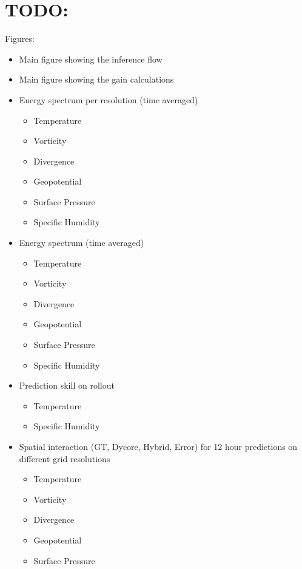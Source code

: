 \section{TODO:}

Figures:
\begin{itemize}
    \item Main figure showing the inference flow
    \item Main figure showing the gain calculations
    \item Energy spectrum per resolution (time averaged)
        \begin{itemize}
            \item Temperature
            \item Vorticity
            \item Divergence
            \item Geopotential
            \item Surface Pressure
            \item Specific Humidity
        \end{itemize} 
    \item Energy spectrum (time averaged)
        \begin{itemize}
            \item Temperature
            \item Vorticity
            \item Divergence
            \item Geopotential
            \item Surface Pressure
            \item Specific Humidity
        \end{itemize}
    \item Prediction skill on rollout
        \begin{itemize}
            \item Temperature
            \item Specific Humidity
        \end{itemize}
    \item Spatial interaction (GT, Dycore, Hybrid, Error) for  12 hour predictions on different grid resolutions
        \begin{itemize}
            \item Temperature
            \item Vorticity
            \item Divergence
            \item Geopotential
            \item Surface Pressure

\end{itemize}
\end{itemize}
